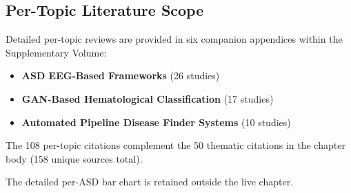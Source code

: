 \begin{table}[!htbp]
\end{table}
\fi %
\fi %

\subsection{Per-Topic Literature Scope}

Detailed per-topic reviews are provided in six companion appendices within the Supplementary Volume:

\begin{itemize}
    \item \textbf{ASD EEG-Based Frameworks} (26 studies)
    \item \textbf{GAN-Based Hematological Classification} (17 studies)
    \item \textbf{Automated Pipeline Disease Finder Systems} (10 studies)
\end{itemize}

The 108 per-topic citations complement the 50 thematic citations in the chapter body (158 unique sources total).


The detailed per-ASD bar chart is retained outside the live chapter.

